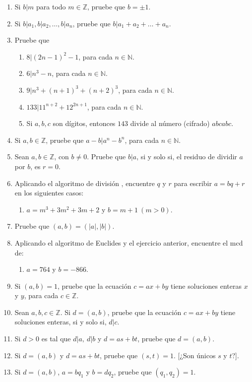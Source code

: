 \documentclass[11pt]{article}
\newcommand{\N}{\mathbb{N}}
\newcommand{\Z}{\mathbb{Z}}
\begin{document}
\begin{enumerate}[start=2]
  \item Si $b|m$ para todo $m\in \Z$, pruebe que $b= \pm 1$.
  \item Si $b|a_1, b|a_2, \dots, b|a_n$, pruebe que $b|a_1+a_2+\dots +a_n$.
  \item Pruebe que
    \begin{enumerate}[label=4.\arabic*]
      \item $8|(2n-1)^2-1$, para cada $n\in\N$.
      \item $6|n^3-n$, para cada $n\in \N$.
      \item $9|n^3+(n+1)^3+(n+2)^3$, para cada $n \in \N$.
      \item $133|11^{n+2}+12^{2n+1}$, para cada $n\in \N$.
      \item Si $a,b,c$ son dígitos, entonces $143$ divide al número   (cifrado) $abcabc$.
    \end{enumerate}
  \item Si $a,b\in \Z$, pruebe que $a-b|a^n-b^n$, para cada $n\in \N$.
  \item Sean $a,b\in \Z$, con $b \neq 0$. Pruebe que $b|a$, si y solo si, el residuo de dividir $a$ por $b$, es $r=0$.
  \item Aplicando el algoritmo de división , encuentre $q$ y $r$ para escribir $a=bq+r$ en los siguientes casos:
    \begin{enumerate}[label=7.10]
      \item $a=m^3+3m^2+3m+2$ y $b=m+1 \ (m>0)$.
    \end{enumerate}
  \item Pruebe que $(a,b)=(|a|,|b|)$.
  \item Aplicando el algoritmo de Euclides y el ejercicio anterior, encuentre el mcd de:
    \begin{enumerate}[label=9.5]
      \item $a=764$ y $b=-866$.
    \end{enumerate}
  \item Si $(a,b)=1$, pruebe que la ecuación $c=ax+by$ tiene soluciones enteras $x$ y $y$, para cada $c\in\Z$.
  \item Sean $a,b,c \in\Z$. Si $d=(a,b)$, pruebe que la ecuación $c=ax+by$ tiene soluciones enteras, si y solo si, $d|c$.
  \item Si $d>0$ es tal que $d|a, \ d|b$ y $d=as+bt$, pruebe que $d=(a,b)$.
  \item Si $d=(a,b)$ y $d=as+bt$, pruebe que $(s,t)=1$. [¿Son únicos $s$ y $t$?].
  \item Si $d=(a,b)$, $a=bq_1$ y $b=dq_2$, pruebe que $(q_1,q_2)=1$.

\end{enumerate}
\end{document}

